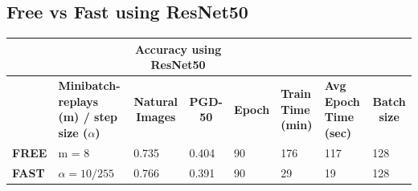 \documentclass{article}
\begin{document}
\subsection{Free vs Fast using ResNet50}


\begin{table}[hbt!]
\begin{tabular}{|l|p{2.1cm}|c|l|l|l|l|l|}
\hline
              & \multicolumn{1}{l|}{}         &
              \multicolumn{2}{c|}{\textbf{Accuracy using ResNet50}}
              & \multicolumn{3}{l|}{\textbf{}}
              & \textbf{}                                \\ \hline
 & \textbf{Minibatch-replays (m) / step size ($\alpha$)} & \textbf{Natural
 Images}                      & \multicolumn{1}{c|}{\textbf{PGD-50}} &
 \multicolumn{1}{c|}{\textbf{Epoch}} & \multicolumn{1}{p{1cm}|}{\textbf{Train
 Time (min)}} & \multicolumn{1}{p{1cm}|}{\textbf{Avg Epoch Time (sec)}} &
 \multicolumn{1}{c|}{\textbf{Batch size}} \\ \hline
\textbf{FREE} & m = 8 & \multicolumn{1}{l|}{0.735} & { 0.404}         & { 90}
& { 176}                     & { 117}                         & { 128}
\\ \hline
\textbf{FAST} & $\alpha = 10/255$       & \multicolumn{1}{l|}{0.766} & { 0.391}
& { 90}           & { 29}                     & { 19}                         &
{ 128}               \\ \hline
\end{tabular}
\end{table}

\newpage
\end{document}
